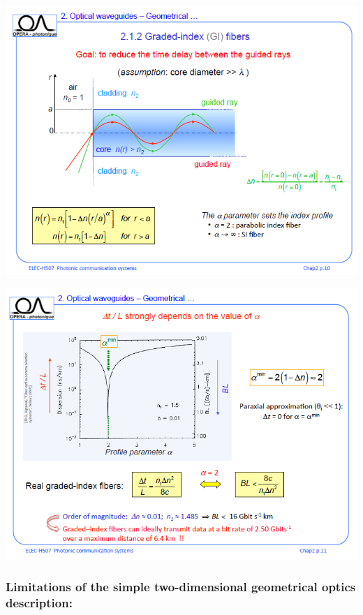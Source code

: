 \begin{center}
	\includegraphics[scale=0.5]{ch1/image8}
\end{center}

\begin{center}
	\includegraphics[scale=0.5]{ch1/image9}
\end{center}


\subsubsection{Limitations of the simple two-dimensional geometrical optics description:}

